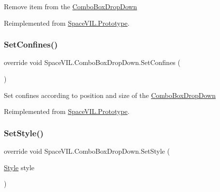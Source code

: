 Remove item from the \mbox{\hyperlink{class_space_v_i_l_1_1_combo_box_drop_down}{Combo\+Box\+Drop\+Down}} 



Reimplemented from \mbox{\hyperlink{class_space_v_i_l_1_1_prototype_a7a2aabccfe6389f71d0265fa73f0ae87}{Space\+V\+I\+L.\+Prototype}}.

\mbox{\label{class_space_v_i_l_1_1_combo_box_drop_down_a236066889e0b652410d02de2b4cb51c7}} 
\subsubsection{\texorpdfstring{Set\+Confines()}{SetConfines()}}
{\footnotesize\ttfamily override void Space\+V\+I\+L.\+Combo\+Box\+Drop\+Down.\+Set\+Confines (\begin{DoxyParamCaption}{ }\end{DoxyParamCaption})\hspace{0.3cm}{\ttfamily [virtual]}}



Set confines according to position and size of the \mbox{\hyperlink{class_space_v_i_l_1_1_combo_box_drop_down}{Combo\+Box\+Drop\+Down}} 



Reimplemented from \mbox{\hyperlink{class_space_v_i_l_1_1_prototype_af063fd80d51a3c42c8f43e0e97b6b809}{Space\+V\+I\+L.\+Prototype}}.

\mbox{\label{class_space_v_i_l_1_1_combo_box_drop_down_ad400783300d69cd5b90ebdb8400aa4a6}} 
\subsubsection{\texorpdfstring{Set\+Style()}{SetStyle()}}
{\footnotesize\ttfamily override void Space\+V\+I\+L.\+Combo\+Box\+Drop\+Down.\+Set\+Style (\begin{DoxyParamCaption}\item[{\mbox{\hyperlink{class_space_v_i_l_1_1_decorations_1_1_style}{Style}}}]{style }\end{DoxyParamCaption})\hspace{0.3cm}{\ttfamily [virtual]}}




